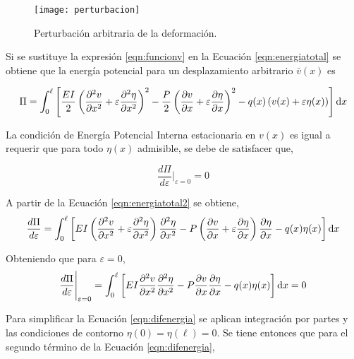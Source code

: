 \begin{figure}[htb]
	\centering
	\texttt{[image: perturbacion]}
	\caption{Perturbación arbitraria de la deformación.}
	\label{fig:perturbacion}
\end{figure}

Si se sustituye la expresión \eqref{eqn:funcionv} en la Ecuación \eqref{eqn:energiatotal} se obtiene que la energía potencial para un desplazamiento arbitrario $\bar{v}(x)$ es

\begin{equation}\label{eqn:energiatotal2}
\Pi = \int_0^\ell \left[ \frac{EI}{2} \left( \frac{\partial^2 v}{\partial x^2} + \varepsilon\frac{\partial^2 \eta}{\partial x^2} \right)^2 - \frac{P}{2} \left(\frac{\partial v}{\partial x} + \varepsilon\frac{\partial \eta}{\partial x}\right)^2- q(x) \left( v(x)+\varepsilon\eta(x)\right) \right] {\text{d}} x
\end{equation}

La condición de Energía Potencial Interna estacionaria en $v(x)$ es igual a requerir que para todo $\eta(x)$ admisible, se debe de satisfacer que,

\begin{equation}
\frac{d\Pi}{d\varepsilon} \Bigg|_{\varepsilon=0} = 0
\end{equation}

A partir de la Ecuación \eqref{eqn:energiatotal2} se obtiene,
\begin{equation}
\frac{d\Pi}{d\varepsilon} = \int_0^\ell \left[ EI \left( \frac{\partial^2 v}{\partial x^2} + \varepsilon\frac{\partial^2 \eta}{\partial x^2} \right) \frac{\partial^2 \eta}{\partial x^2} - P \left(\frac{\partial v}{\partial x} + \varepsilon\frac{\partial \eta}{\partial x}\right)\frac{\partial \eta}{\partial x}- q(x) \eta(x) \right] {\text{d}} x
\end{equation}

Obteniendo que para $\varepsilon=0$,
\begin{equation}\label{eqn:difenergia}
\frac{d\Pi}{d\varepsilon} \Bigg|_{\varepsilon=0} = \int_0^\ell \left[ EI \frac{\partial^2 v}{\partial x^2} \frac{\partial^2 \eta}{\partial x^2} - P \frac{\partial v}{\partial x}\frac{\partial \eta}{\partial x}- q(x) \eta(x) \right] {\text{d}} x = 0
\end{equation}

Para simplificar la Ecuación \eqref{eqn:difenergia} se aplican integración por partes y las condiciones de contorno $\eta(0)=\eta(\ell)=0$. Se tiene entonces que para el segundo término de la Ecuación \eqref{eqn:difenergia},

